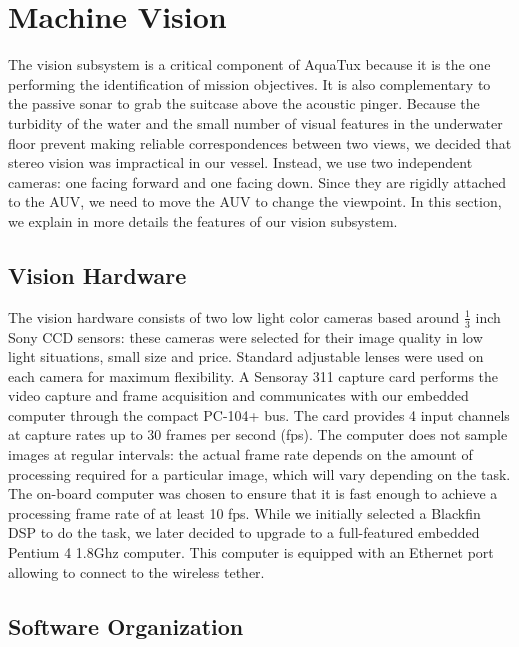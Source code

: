 \section{Machine Vision }

The vision subsystem is a critical component of AquaTux because it is
the one performing the identification of mission objectives. It is
also complementary to the passive sonar to grab the suitcase above the
acoustic pinger. Because the turbidity of the water and the small
number of visual features in the underwater floor prevent making
reliable correspondences between two views, we decided that stereo
vision was impractical in our vessel. Instead, we use two independent
cameras: one facing forward and one facing down. Since they
are rigidly attached to the AUV, we need to move the AUV
to change the viewpoint. In this section, we explain in more details
the features of our vision subsystem.


\subsection{Vision Hardware}
The vision hardware consists of two low light color cameras based
around $\frac{1}{3}$ inch Sony CCD sensors: these cameras were selected for their
image quality in low light situations, small size and price. Standard
adjustable lenses were used on each camera for maximum flexibility. A
Sensoray 311 capture card performs the video capture and frame
acquisition and communicates with our embedded computer through the
compact PC-104+ bus. The card provides 4 input channels at capture
rates up to 30 frames per second (fps). The computer does not sample
images at regular intervals: the actual frame rate depends on the
amount of processing required for a particular image, which will vary
depending on the task. The on-board computer was chosen to ensure that
it is fast enough to achieve a processing frame rate of at least 10
fps.  While we initially selected a Blackfin DSP to do the task, we
later decided to upgrade to a full-featured embedded Pentium 4 1.8Ghz
computer. This computer is equipped with an Ethernet port allowing to
connect to the wireless tether.


\subsection{Software Organization}
\label{gui}


